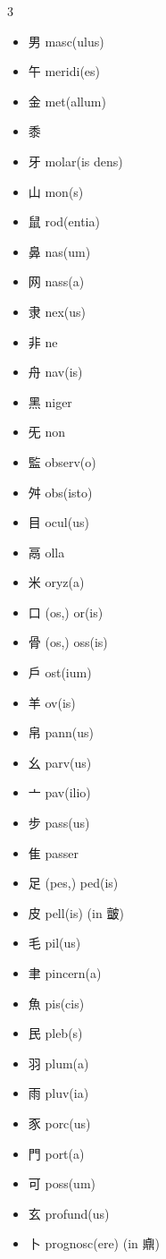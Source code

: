 \documentclass[xetex, svgnames, 12pt]{scrartcl}
\begin{document}
\begin{multicols}{3}
\begin{itemize}[noitemsep]
   \item 男 masc(ulus) 
   \item 午 meridi(es)
   \item 金 met(allum)
   \item 黍 
   \item 牙 molar(is dens)
    \item 山 mon(s)
   \item 鼠 rod(entia)
    \item 鼻 nas(um)
    \item 网 nass(a) 
    \item 隶 nex(us)
    \item 非 ne
    \item 舟 nav(is) 
    \item 黑 niger 
    \item 旡 non 
    \item 監 observ(o) 
    \item 舛 obs(isto) 
    \item 目 ocul(us)
    \item 鬲 olla
    \item 米 oryz(a) 
    \item 口 (os,) or(is)
    \item 骨 (os,) oss(is) 
    \item 戶 ost(ium)
    \item 羊 ov(is)
    \item 帛 pann(us)
    \item 幺 parv(us) 
    \item 亠 pav(ilio)
    \item 步 pass(us)
    \item 隹 passer
    \item 足 (pes,) ped(is) 
    \item 皮 pell(is) (in 皽)
    \item 毛 pil(us)
    \item 聿 pincern(a) 
    \item 魚 pis(cis) 
    \item 民 pleb(s)
    \item 羽 plum(a)
    \item 雨 pluv(ia) 
    \item 豕 porc(us) 
    \item 門 port(a) 
    \item 可 poss(um) 
    \item 玄 profund(us) 
    \item 卜 prognosc(ere) (in 鼑)

\end{itemize}
\end{multicols}
\end{document}
